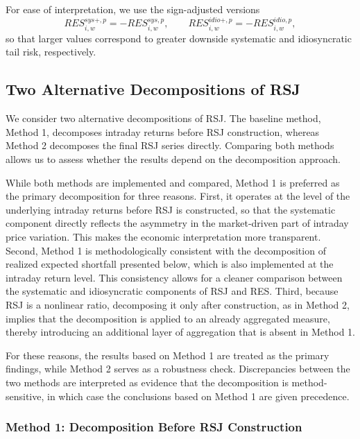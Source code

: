 \documentclass[11pt,a4paper]{article}
\begin{document}
For ease of interpretation, we use the sign-adjusted versions
\begin{equation}
RES_{i,w}^{sys+,p}=-RES_{i,w}^{sys,p},
\qquad
RES_{i,w}^{idio+,p}=-RES_{i,w}^{idio,p},
\label{eq:res_decomp_adj}
\end{equation}
so that larger values correspond to greater downside systematic and
idiosyncratic tail risk, respectively.

\subsection{Two Alternative Decompositions of RSJ}

We consider two alternative decompositions of RSJ. The baseline method,
Method 1, decomposes intraday returns before RSJ construction, whereas
Method 2 decomposes the final RSJ series directly. Comparing both
methods allows us to assess whether the results depend on the
decomposition approach.

While both methods are implemented and compared, Method 1 is preferred
as the primary decomposition for three reasons. First, it operates at
the level of the underlying intraday returns before RSJ is constructed,
so that the systematic component directly reflects the asymmetry in the
market-driven part of intraday price variation. This makes the economic
interpretation more transparent. Second, Method 1 is methodologically
consistent with the decomposition of realized expected shortfall
presented below, which is also implemented at the intraday return
level. This consistency allows for a cleaner comparison between the
systematic and idiosyncratic components of RSJ and RES. Third, because
RSJ is a nonlinear ratio, decomposing it only after construction, as in
Method 2, implies that the decomposition is applied to an already
aggregated measure, thereby introducing an additional layer of
aggregation that is absent in Method 1.

For these reasons, the results based on Method 1 are treated as the
primary findings, while Method 2 serves as a robustness check.
Discrepancies between the two methods are interpreted as evidence that
the decomposition is method-sensitive, in which case the conclusions
based on Method 1 are given precedence.

\subsubsection{Method 1: Decomposition Before RSJ Construction}
\end{document}
